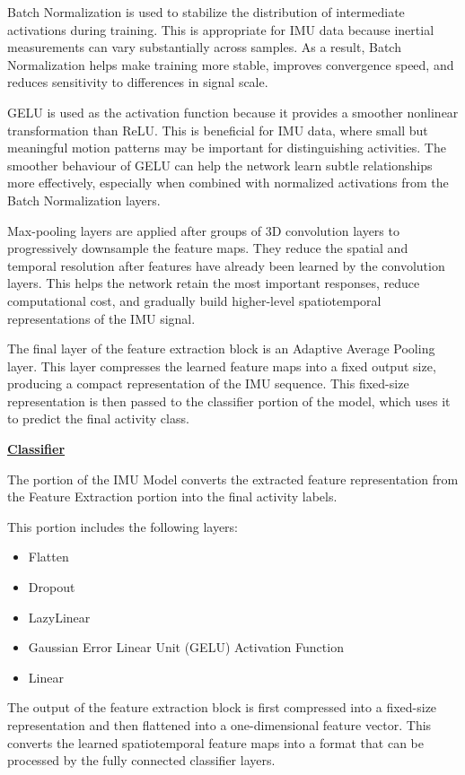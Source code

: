 Batch Normalization is used to stabilize the distribution of intermediate activations during training. This is appropriate for IMU data because inertial measurements can vary substantially across samples. As a result, Batch Normalization helps make training more stable, improves convergence speed, and reduces sensitivity to differences in signal scale.

GELU is used as the activation function because it provides a smoother nonlinear transformation than ReLU. This is beneficial for IMU data, where small but meaningful motion patterns may be important for distinguishing activities. The smoother behaviour of GELU can help the network learn subtle relationships more effectively, especially when combined with normalized activations from the Batch Normalization layers.

Max-pooling layers are applied after groups of 3D convolution layers to progressively downsample the feature maps. They reduce the spatial and temporal resolution after features have already been learned by the convolution layers. This helps the network retain the most important responses, reduce computational cost, and gradually build higher-level spatiotemporal representations of the IMU signal.

The final layer of the feature extraction block is an Adaptive Average Pooling layer. This layer compresses the learned feature maps into a fixed output size, producing a compact representation of the IMU sequence. This fixed-size representation is then passed to the classifier portion of the model, which uses it to predict the final activity class.

\textbf{\underline{Classifier}}

The portion of the IMU Model converts the extracted feature representation from the Feature Extraction portion into the final activity labels.

This portion includes the following layers:
\begin{itemize}
    \item Flatten 
    \item Dropout
    \item LazyLinear
    \item Gaussian Error Linear Unit (GELU) Activation Function
    \item Linear
\end{itemize}

The output of the feature extraction block is first compressed into a fixed-size representation and then flattened into a one-dimensional feature vector. This converts the learned spatiotemporal feature maps into a format that can be processed by the fully connected classifier layers.

